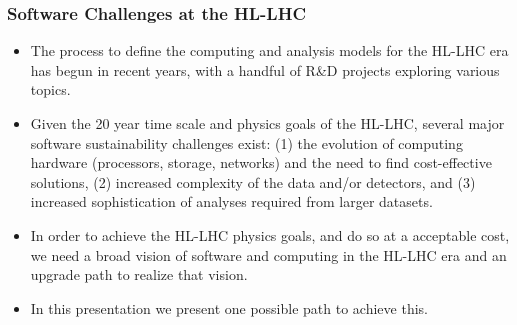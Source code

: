 \begin{frame}
 \frametitle{Software Challenges at the HL-LHC}

\begin{itemize}
\item The process to define the computing and analysis models for the HL-LHC era has begun in recent years, with a handful of R\&D projects exploring various topics.
\item Given the 20 year time scale and physics goals of the HL-LHC, several major software sustainability challenges exist: 
(1) the evolution of computing hardware (processors,
storage, networks) and the need to find cost-effective solutions,
(2) increased complexity of the data %
and/or detectors, and (3) increased sophistication of analyses required
from larger datasets.
\item In order to achieve the HL-LHC physics goals, and do so at a acceptable
cost, we need a broad vision of software and computing in the HL-LHC era and an upgrade path to realize that vision.
\item In this presentation we present one possible path to achieve this.
\end{itemize}

\end{frame}
